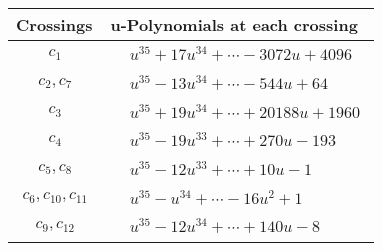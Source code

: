 \documentclass[1p]{elsarticle_modified}
\theoremstyle{definition}
\begin{document}
\begin{tabular}{m{50pt}|m{274pt}}
Crossings & \hspace{64pt}u-Polynomials at each crossing \\
\hline $$\begin{aligned}c_{1}\end{aligned}$$&$\begin{aligned}
&u^{35}+17 u^{34}+\cdots-3072 u+4096
\end{aligned}$\\
\hline $$\begin{aligned}c_{2},c_{7}\end{aligned}$$&$\begin{aligned}
&u^{35}-13 u^{34}+\cdots-544 u+64
\end{aligned}$\\
\hline $$\begin{aligned}c_{3}\end{aligned}$$&$\begin{aligned}
&u^{35}+19 u^{34}+\cdots+20188 u+1960
\end{aligned}$\\
\hline $$\begin{aligned}c_{4}\end{aligned}$$&$\begin{aligned}
&u^{35}-19 u^{33}+\cdots+270 u-193
\end{aligned}$\\
\hline $$\begin{aligned}c_{5},c_{8}\end{aligned}$$&$\begin{aligned}
&u^{35}-12 u^{33}+\cdots+10 u-1
\end{aligned}$\\
\hline $$\begin{aligned}c_{6},c_{10},c_{11}\end{aligned}$$&$\begin{aligned}
&u^{35}- u^{34}+\cdots-16 u^2+1
\end{aligned}$\\
\hline $$\begin{aligned}c_{9},c_{12}\end{aligned}$$&$\begin{aligned}
&u^{35}-12 u^{34}+\cdots+140 u-8
\end{aligned}$\\
\hline
\end{tabular}\\~\\
\newpage\renewcommand{\arraystretch}{1}
\end{document}
